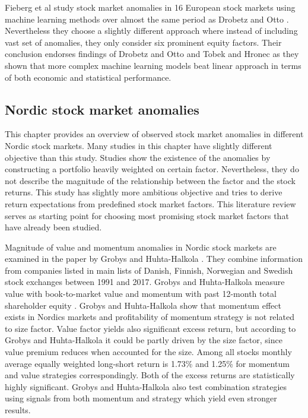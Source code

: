\documentclass{article}
\begin{document}
Fieberg et al \citeyear{Fieberg} study stock market anomalies in 16 European stock markets using machine learning methods over almost the same period as Drobetz and Otto \citeyear{Drobetz} \footnotemark. Nevertheless they choose a slightly different approach where instead of including vast set of anomalies, they only consider six prominent equity factors. Their conclusion endorses findings of Drobetz and Otto \citeyear{Drobetz} and Tobek and Hronec \citeyear{TOBEK2021100588} as they shown that more complex machine learning models beat linear approach in terms of both economic and statistical performance. \par


\subsection{Nordic stock market anomalies}\label{NordicStockMarketAnomalies}

This chapter provides an overview of observed stock market anomalies in different Nordic stock markets. Many studies in this chapter have slightly different objective than this study. Studies show the existence of the anomalies by constructing a portfolio heavily weighted on certain factor. Nevertheless, they do not describe the magnitude of the relationship between the factor and the stock returns. This study has slightly more ambitious objective and tries to derive return expectations from predefined stock market factors. This literature review serves as starting point for choosing most promising stock market factors that have already been studied. \par

Magnitude of value and momentum anomalies in Nordic stock markets are examined in the paper by Grobys and Huhta-Halkola \citeyear{grobys}. They combine information from companies listed in main lists of Danish, Finnish, Norwegian and Swedish stock exchanges between 1991 and 2017. Grobys and Huhta-Halkola measure value with book-to-market value and momentum with past 12-month total shareholder equity%
. Grobys and Huhta-Halkola show that momentum effect exists in Nordics markets and profitability of momentum strategy is not related to size factor. Value factor yields also significant excess return, but according to Grobys and Huhta-Halkola it could be partly driven by the size factor, since value premium reduces when accounted for the size. Among all stocks monthly average equally weighted long-short return is 1.73\% and 1.25\% for momentum and value strategies correspondingly. Both of the excess returns are statistically highly significant. Grobys and Huhta-Halkola also test combination strategies using signals from both momentum and strategy which yield even stronger results. \par
\end{document}

